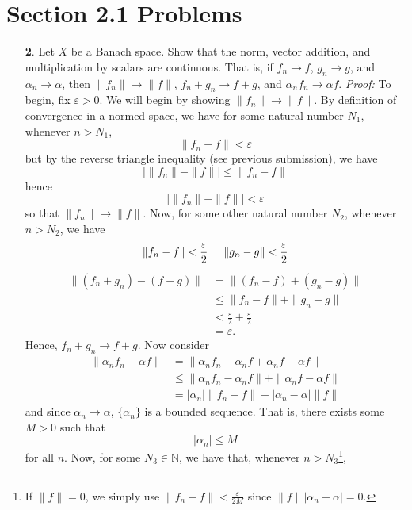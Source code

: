 \documentclass{article}
\begin{document}
\begin{itemize}
\end{itemize}


\section*{Section 2.1 Problems}
\begin{itemize}
    \item[\textbf{2}.] Let $X$ be a Banach space. Show that the norm, vector addition, and multiplication by scalars are continuous. That is, if $f_n \to f$, $g_n \to g$, and $\alpha_n \to \alpha$, then $\|f_n\| \to \|f\|$, $f_n + g_n \to f + g$, and $\alpha_nf_n \to \alpha f$. 
    \newline\newline
    \textit{Proof:} To begin, fix $\varepsilon > 0$. We will begin by showing $\|f_n\| \to \|f\|$. By definition of convergence in a normed space, we have for some natural number $N_1$, whenever $n > N_1$,
    \[\|f_n - f\| < \varepsilon\]
    but by the reverse triangle inequality (see previous submission), we have
    \[|\|f_n\| - \|f\|| \leq \|f_n - f\|\]
    hence
    \[|\|f_n\| - \|f\|| < \varepsilon\]
    so that $\|f_n\| \to \|f\|$. Now, for some other natural number $N_2$, whenever $n > N_2$, we have
    \[\|f_n - f\| < \frac{\varepsilon}{2} \hspace{0.5cm} \|g_n - g\| < \frac{\varepsilon}{2}\]
    \begin{align*}
        \|(f_n + g_n) - (f - g)\| &= \|(f_n - f) + (g_n - g)\|\\
        &\leq \|f_n - f\| + \|g_n - g\|\\
        &< \frac{\varepsilon}{2} + \frac{\varepsilon}{2}\\
        &= \varepsilon.
    \end{align*}
    Hence, $f_n + g_n \to f + g$. Now consider
    \begin{align*}
        \|\alpha_n f_n - \alpha f\| &= \|\alpha_n f_n - \alpha_n f + \alpha_n f - \alpha f\|\\
        &\leq \|\alpha_nf_n - \alpha_n f\| + \|\alpha_n f - \alpha f\|\\
        &= |\alpha_n|\|f_n - f\| + |\alpha_n - \alpha|\|f\| \tag*{(Homogeneity of the norm)}
    \end{align*}
    and since $\alpha_n \to \alpha$, $\{\alpha_n\}$ is a bounded sequence. That is, there exists some $M > 0$ such that 
    \[|\alpha_n| \leq M\]
    for all $n$. Now, for some $N_3 \in \mathbb{N}$, we have that, whenever $n > N_3$\footnote[2]{If $\|f\| = 0$, we simply use $\|f_n - f\| < \frac{\varepsilon}{2M}$ since $\|f\||\alpha_n - \alpha| = 0$.},

\end{itemize}
\end{document}
